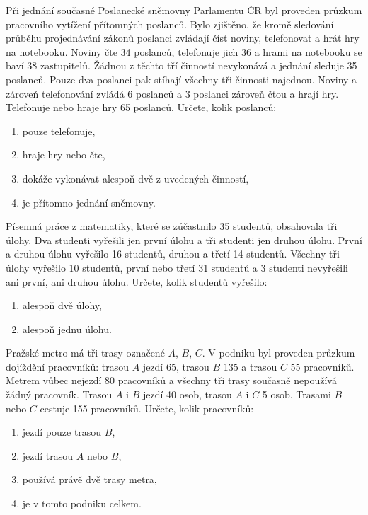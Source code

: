 \documentclass[12pt,a4paper]{article}
\begin{document}
\begin{exercise}
Při jednání současné Poslanecké sněmovny Parlamentu ČR byl proveden průzkum 
pracovního vytížení přítomných poslanců. Bylo zjištěno, že kromě sledování 
průběhu projednávání zákonů poslanci zvládají číst noviny, telefonovat a hrát hry 
na notebooku. Noviny čte 34 poslanců, telefonuje jich 36 a hrami na notebooku se 
baví 38 zastupitelů. Žádnou z těchto tří činností nevykonává a jednání sleduje 
35 poslanců. Pouze dva poslanci pak stíhají všechny tři činnosti najednou.  
Noviny a zároveň telefonování zvládá 6 poslanců a 3 poslanci zároveň čtou a hrají hry.  
Telefonuje nebo hraje hry 65 poslanců. Určete, kolik poslanců:  
\begin{enumerate}[label=\alph*)]
    \item pouze telefonuje,
    \item hraje hry nebo čte,
    \item dokáže vykonávat alespoň dvě z uvedených činností,
    \item je přítomno jednání sněmovny.
\end{enumerate}
\end{exercise}


\begin{exercise}
Písemná práce z matematiky, které se zúčastnilo 35 studentů, obsahovala tři úlohy.
Dva studenti vyřešili jen první úlohu a tři studenti jen druhou úlohu.
První a druhou úlohu vyřešilo 16 studentů, druhou a třetí 14 studentů.
Všechny tři úlohy vyřešilo 10 studentů, první nebo třetí 31 studentů
a 3 studenti nevyřešili ani první, ani druhou úlohu.
Určete, kolik studentů vyřešilo:
\begin{enumerate}[label=\alph*)]
    \item alespoň dvě úlohy,
    \item alespoň jednu úlohu.
\end{enumerate}
\end{exercise}


\begin{exercise}
Pražské metro má tři trasy označené $A$, $B$, $C$. 
V podniku byl proveden průzkum dojíždění pracovníků:
trasou $A$ jezdí 65, trasou $B$ 135 a trasou $C$ 55 pracovníků.
Metrem vůbec nejezdí 80 pracovníků a všechny tři trasy současně nepoužívá žádný pracovník.
Trasou $A$ i $B$ jezdí 40 osob, trasou $A$ i $C$ 5 osob.
Trasami $B$ nebo $C$ cestuje 155 pracovníků.
Určete, kolik pracovníků:
\begin{enumerate}[label=\alph*)]
    \item jezdí pouze trasou $B$,
    \item jezdí trasou $A$ nebo $B$,
    \item používá právě dvě trasy metra,
    \item je v tomto podniku celkem.
\end{enumerate}
\end{exercise}
\end{document}
